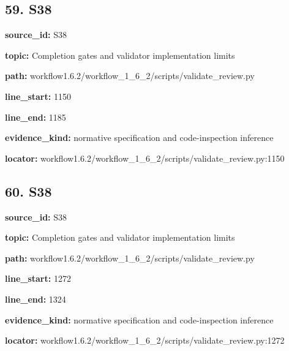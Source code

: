 \documentclass[10pt,a4paper]{article}
\begin{document}
\subsection*{59.\allowbreak{} S38}
\textbf{source\_\allowbreak{}id:} S38\par
\textbf{topic:} Completion gates and validator implementation limits\par
\textbf{path:} workflow1.\allowbreak{}6.\allowbreak{}2/\allowbreak{}workflow\_\allowbreak{}1\_\allowbreak{}6\_\allowbreak{}2/\allowbreak{}scripts/\allowbreak{}validate\_\allowbreak{}review.\allowbreak{}py\par
\textbf{line\_\allowbreak{}start:} 1150\par
\textbf{line\_\allowbreak{}end:} 1185\par
\textbf{evidence\_\allowbreak{}kind:} normative specification and code-\allowbreak{}inspection inference\par
\textbf{locator:} workflow1.\allowbreak{}6.\allowbreak{}2/\allowbreak{}workflow\_\allowbreak{}1\_\allowbreak{}6\_\allowbreak{}2/\allowbreak{}scripts/\allowbreak{}validate\_\allowbreak{}review.\allowbreak{}py:1150\par
\subsection*{60.\allowbreak{} S38}
\textbf{source\_\allowbreak{}id:} S38\par
\textbf{topic:} Completion gates and validator implementation limits\par
\textbf{path:} workflow1.\allowbreak{}6.\allowbreak{}2/\allowbreak{}workflow\_\allowbreak{}1\_\allowbreak{}6\_\allowbreak{}2/\allowbreak{}scripts/\allowbreak{}validate\_\allowbreak{}review.\allowbreak{}py\par
\textbf{line\_\allowbreak{}start:} 1272\par
\textbf{line\_\allowbreak{}end:} 1324\par
\textbf{evidence\_\allowbreak{}kind:} normative specification and code-\allowbreak{}inspection inference\par
\textbf{locator:} workflow1.\allowbreak{}6.\allowbreak{}2/\allowbreak{}workflow\_\allowbreak{}1\_\allowbreak{}6\_\allowbreak{}2/\allowbreak{}scripts/\allowbreak{}validate\_\allowbreak{}review.\allowbreak{}py:1272\par
\end{document}
